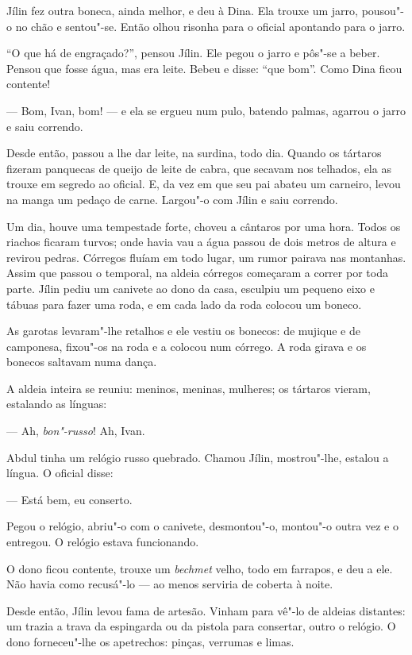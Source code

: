 Jílin fez outra boneca, ainda melhor, e deu à Dina. Ela trouxe um jarro,
pousou"-o no chão e sentou"-se. Então olhou risonha para o oficial
apontando para o jarro.

``O que há de engraçado?'', pensou Jílin. Ele pegou o jarro e pôs"-se a
beber. Pensou que fosse água, mas era leite. Bebeu e disse: ``que bom''.
Como Dina ficou contente!

--- Bom, Ivan, bom! --- e ela se ergueu num pulo, batendo palmas,
agarrou o jarro e saiu correndo.

Desde então, passou a lhe dar leite, na surdina, todo dia. Quando os
tártaros fizeram panquecas de queijo de leite de cabra, que secavam nos
telhados, ela as trouxe em segredo ao oficial. E, da vez em que seu pai
abateu um carneiro, levou na manga um pedaço de carne.
Largou"-o com Jílin e saiu correndo.

Um dia, houve uma tempestade forte, choveu a cântaros por uma hora.
Todos os riachos ficaram turvos; onde havia vau a água passou de dois
metros de altura e revirou pedras. Córregos fluíam em todo lugar, um
rumor pairava nas montanhas. Assim que passou o temporal, na aldeia
córregos começaram a correr por toda parte. Jílin pediu um canivete ao
dono da casa, esculpiu um pequeno eixo e tábuas para fazer uma roda, e
em cada lado da roda colocou um boneco.

As garotas levaram"-lhe retalhos e ele vestiu os bonecos: de mujique e de
camponesa, fixou"-os na roda e a colocou num córrego. A roda girava e os
bonecos saltavam numa dança.

A aldeia inteira se reuniu: meninos, meninas, mulheres; os tártaros
vieram, estalando as línguas:

--- Ah, \emph{bon"-russo}! Ah, Ivan.

Abdul tinha um relógio russo quebrado. Chamou Jílin, mostrou"-lhe,
estalou a língua. O oficial disse:

--- Está bem, eu conserto.

Pegou o relógio, abriu"-o com o canivete, desmontou"-o, montou"-o outra vez
e o entregou. O relógio estava funcionando.

O dono ficou contente, trouxe um \emph{bechmet} velho, todo em farrapos,
e deu a ele. Não havia como recusá"-lo --- ao menos serviria de coberta à
noite.

Desde então, Jílin levou fama de artesão. Vinham para vê"-lo de aldeias
distantes: um trazia a trava da espingarda ou da pistola para consertar,
outro o relógio. O dono forneceu"-lhe os apetrechos: pinças, verrumas e
limas.

